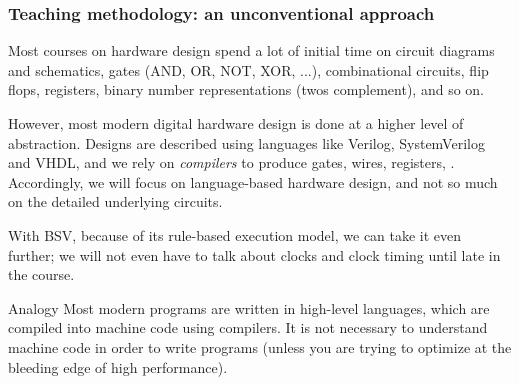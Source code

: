 \begin{frame}
\frametitle{Teaching methodology: an unconventional approach}

Most courses on hardware design spend a lot of initial time on circuit
diagrams and schematics, gates (AND, OR, NOT, XOR, ...), combinational
circuits, flip flops, registers, binary number representations (twos
complement), and so on.

\vspace{1ex}

However, most modern digital hardware design is done at a higher level
of abstraction.  Designs are described using languages like Verilog,
SystemVerilog and VHDL, and we rely on \emph{compilers} to produce
gates, wires, registers, {\etc}.  Accordingly, we will focus on
language-based hardware design, and not so much on the detailed
underlying circuits.

\vspace{1ex}

With BSV, because of its rule-based execution model, we can take it
even further; we will not even have to talk about clocks and clock
timing until late in the course.

\vspace*{5ex}

\footnotesize

\begin{block}{Analogy}
Most modern programs are written in high-level languages, which are
compiled into machine code using compilers.  It is not necessary to
understand machine code in order to write programs (unless you are
trying to optimize at the bleeding edge of high performance).

\end{block}

\end{frame}



